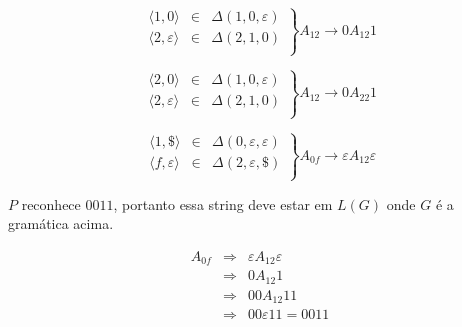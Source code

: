 \begin{example}
    \begin{center}
  \end{center}

\begin{displaymath}
  \left.\begin{array}{ccc}
    \langle 1, 0 \rangle & \in & \Delta(1, 0, \varepsilon)\\
    \langle 2, \varepsilon \rangle & \in & \Delta(2, 1, 0)\\
  \end{array}\right\} A_{12} \to 0 A_{12} 1
\end{displaymath}

\begin{displaymath}
  \left.\begin{array}{ccc}
    \langle 2, 0 \rangle & \in & \Delta(1, 0, \varepsilon)\\
    \langle 2, \varepsilon \rangle & \in & \Delta(2, 1, 0)\\
  \end{array}\right\} A_{12} \to 0 A_{22} 1
\end{displaymath}

\begin{displaymath}
  \left.\begin{array}{ccc}
      \langle 1, \$ \rangle & \in & \Delta(0, \varepsilon, \varepsilon)\\
      \langle f, \varepsilon \rangle & \in & \Delta(2, \varepsilon, \$)\\
    \end{array}\right\} A_{0f} \to \varepsilon A_{12} \varepsilon
\end{displaymath}

$P$ reconhece $0011$, portanto essa string deve estar em $L(G)$ onde $G$ é a gramática acima.


\begin{eqnarray*}
  A_{0f} & \Rightarrow & \varepsilon A_{12} \varepsilon \\
        & \Rightarrow & 0 A_{12} 1 \\
        & \Rightarrow & 00 A_{12} 11 \\
        & \Rightarrow & 00 \varepsilon 11 = 0011
\end{eqnarray*}
\end{example}



